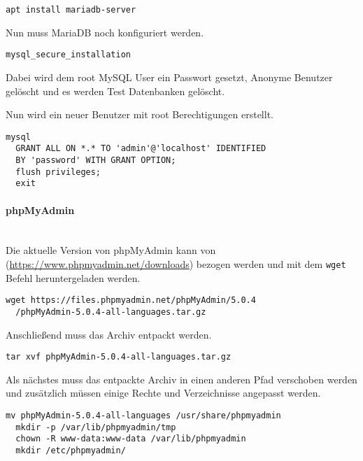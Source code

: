 \begin{lstlisting}[caption={MariadB installieren}]
  apt install mariadb-server
\end{lstlisting}

Nun muss MariaDB noch konfiguriert werden.

\begin{lstlisting}[caption={MariaDB Secure Installation}]
  mysql_secure_installation
\end{lstlisting}

Dabei wird dem root MySQL User ein Passwort gesetzt, Anonyme Benutzer gelöscht
und es werden Test Datenbanken gelöscht.

Nun wird ein neuer Benutzer mit root Berechtigungen erstellt.

\begin{lstlisting}[caption={MariaDB konfiguration}]
  mysql
  GRANT ALL ON *.* TO 'admin'@'localhost' IDENTIFIED 
  BY 'password' WITH GRANT OPTION;
  flush privileges;
  exit
\end{lstlisting}

\paragraph{phpMyAdmin}\mbox{}\\

Die aktuelle Version von phpMyAdmin kann von
(\url{https://www.phpmyadmin.net/downloads}) bezogen werden und mit dem
\verb|wget| Befehl heruntergeladen werden.

\begin{lstlisting}[caption={phpMyAdmin Download}]
  wget https://files.phpmyadmin.net/phpMyAdmin/5.0.4
  /phpMyAdmin-5.0.4-all-languages.tar.gz
\end{lstlisting}

Anschließend muss das Archiv entpackt werden.

\begin{lstlisting}[caption={phpMyAdmin Entpacken}]
  tar xvf phpMyAdmin-5.0.4-all-languages.tar.gz
\end{lstlisting}

Als nächstes muss das entpackte Archiv in einen anderen Pfad verschoben werden
und zusätzlich müssen einige Rechte und Verzeichnisse angepasst werden.

\begin{lstlisting}[caption={phpMyAdmin Rechte und Verzeichnisse}]
  mv phpMyAdmin-5.0.4-all-languages /usr/share/phpmyadmin
  mkdir -p /var/lib/phpmyadmin/tmp
  chown -R www-data:www-data /var/lib/phpmyadmin
  mkdir /etc/phpmyadmin/
\end{lstlisting}

